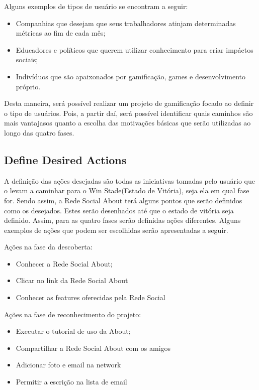 Alguns exemplos de tipos de usuário se encontram a seguir:

\begin{itemize}
    \item Companhias que desejam que seus trabalhadores atinjam determinadas métricas
        ao fim de cada mês;
    \item Educadores e políticos que querem utilizar conhecimento para criar impáctos
        sociais;
    \item Indivíduos que são apaixonados por gamificação, games e desenvolvimento próprio.
\end{itemize}
 
Desta maneira, será possível realizar um projeto de gamificação focado ao definir o tipo
de usuários. Pois, a partir daí, será possível identificar quais caminhos são mais vantajasos
quanto a escolha das motivações básicas que serão utilizadas ao longo das quatro fases.

\subsection{Define Desired Actions}
\label{sub:define_desired_actions}
A definição das ações desejadas são todas as iniciativas tomadas pelo usuário que o levam a caminhar para
o Win Stade(Estado de Vitória), seja ela em qual fase for. Sendo assim, a Rede Social
About terá alguns pontos que serão definidos como os desejados. Estes serão desenhados
até que o estado de vitória seja definido. Assim, para as quatro fases serão definidas
ações diferentes. Alguns exemplos de ações que podem ser escolhidas serão apresentadas
a seguir.

Ações na fase da descoberta:
\begin{itemize}
    \item Conhecer a Rede Social About;
    \item Clicar no link da Rede Social About
    \item Conhecer as features oferecidas pela Rede Social
\end{itemize}


Ações na fase de reconhecimento do projeto: 
\begin{itemize}
    \item Executar o tutorial de uso da About;
    \item Compartilhar a Rede Social About com os amigos
    \item Adicionar foto e email na network
    \item Permitir a escrição na lista de email
\end{itemize}


